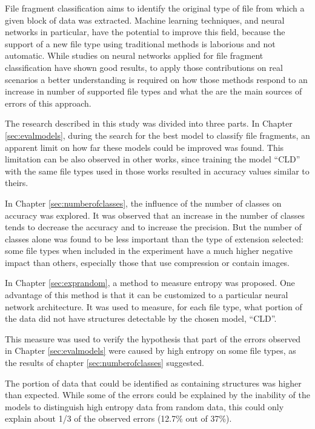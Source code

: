 File fragment classification aims to identify the original type of file from which a given block of
data was extracted. Machine learning techniques, and neural networks in particular, have the potential to improve this field, because the support of a new file type using traditional methods is laborious and not automatic. While studies on neural networks applied for file fragment classification have shown good results, to apply those contributions on real scenarios a better understanding is required on how those methods respond to an increase in number of supported file types and what the are the main sources of errors of this approach.

The research described in this study was divided into three parts.
In Chapter \ref{sec:evalmodels}, during the search for the best model to classify file fragments, an apparent limit on how far these models could be improved was found. This limitation can be also observed in other works, since training the model ``CLD'' with the same file types used in those works resulted in accuracy values similar to theirs.

In Chapter \ref{sec:numberofclasses}, the influence of the number of classes on accuracy was explored. It was observed that an increase in the number of classes tends to decrease the accuracy and to increase the precision. But the number of classes alone was found to be less important than the type of extension selected: some file types when included in the experiment have a much higher negative impact than others, especially those that use compression or contain images.

In Chapter \ref{sec:exprandom}, a method to measure entropy was proposed. One advantage of this method is that it can be customized to a particular neural network architecture. It was used to measure, for each file type, what portion of the data did not have structures detectable by the chosen model, ``CLD''.

This measure was used to verify the hypothesis that part of the errors observed in Chapter \ref{sec:evalmodels} were caused by high entropy on some file types, as the results of chapter  \ref{sec:numberofclasses} suggested.

The portion of data that could be identified as containing structures was higher than expected. While some of the errors could be explained by the inability of the models to distinguish  high entropy data from random data, this could only explain about 1/3 of the observed errors (12.7\% out of 37\%).

